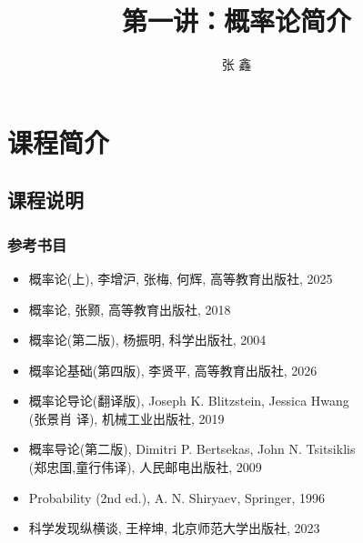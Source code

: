 \documentclass[Prob-All.tex]{subfiles}
\begin{document}
\title[概率论]{第一讲：概率论简介}
\author[张鑫 {\rm Email: xzhangseu@seu.edu.cn} ]{\large 张 鑫}
\date{}


{ 
\begin{frame}
    \titlepage
\end{frame}
}



\section{ 课程简介}
\subsection{课程说明}
\begin{frame}
	\frametitle{参考书目}
	\begin{itemize}[<+-|alert@+>]
		\item 概率论(上), 李增沪, 张梅, 何辉, 高等教育出版社, 2025
		\item 概率论, 张颢, 高等教育出版社, 2018
	    \item 概率论(第二版), 杨振明, 科学出版社, 2004
	    \item 概率论基础(第四版), 李贤平, 高等教育出版社, 2026
		\item 概率论导论(翻译版), {\rm Joseph K. Blitzstein, Jessica Hwang}\\
	    (张景肖 译), 机械工业出版社, 2019
		\item 概率导论(第二版), {\rm Dimitri P. Bertsekas, John N. Tsitsiklis}\\  (郑忠国,童行伟译), 人民邮电出版社, 2009
		\item {\rm Probability (2nd ed.), A. N. Shiryaev, Springer, 1996}
		\item 科学发现纵横谈, 王梓坤, 北京师范大学出版社, 2023
	\end{itemize}
\end{frame}
\end{document}
